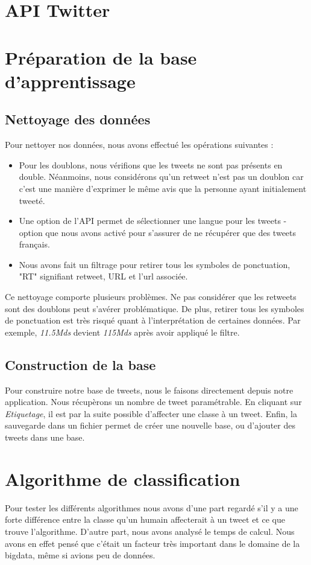 \documentclass[a4paper,10pt]{report}
\begin{document}
  \section{API Twitter}
  \section{Préparation de la base d'apprentissage}
    \subsection{Nettoyage des données}
      Pour nettoyer nos données, nous avons effectué les opérations suivantes : 
      \begin{itemize}
       \item Pour les doublons, nous vérifions que les tweets ne sont pas présents en double. Néanmoins, nous considérons qu'un retweet n'est pas un doublon car c'est une manière d'exprimer le même avis que la personne ayant initialement tweeté.
       \item Une option de l'API permet de sélectionner une langue pour les tweets - option que nous avons activé pour s'assurer de ne récupérer que des tweets français.
       \item Nous avons fait un filtrage pour retirer tous les symboles de ponctuation, "RT" signifiant retweet, URL et l'url associée.
      \end{itemize}
      Ce nettoyage comporte plusieurs problèmes. Ne pas considérer que les retweets sont des doublons peut s'avérer problématique.
      De plus, retirer tous les symboles de ponctuation est très risqué quant à l'interprétation de certaines données.
      Par exemple, \textit{11.5Mds} devient \textit{115Mds} après avoir appliqué le filtre.
      

    \subsection{Construction de la base}
      Pour construire notre base de tweets, nous le faisons directement depuis notre application. Nous récupèrons un nombre de tweet paramétrable.
      En cliquant sur \emph{Etiquetage}, il est par la suite possible d'affecter une classe à un tweet.
      Enfin, la sauvegarde dans un fichier permet de créer une nouvelle base, ou d'ajouter des tweets dans une base.

  \section{Algorithme de classification}
    Pour tester les différents algorithmes nous avons d'une part regardé s'il y a une forte différence entre la classe qu'un humain affecterait à un tweet et ce que trouve l'algorithme.
    D'autre part, nous avons analysé le temps de calcul. Nous avons en effet pensé que c'était un facteur très important dans le domaine de la bigdata, même si avions peu de données.
     
\end{document}
